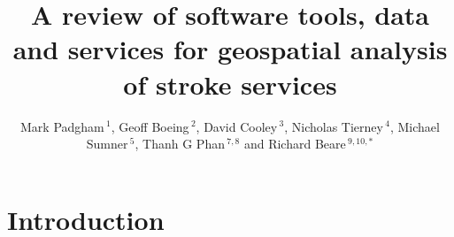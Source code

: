 \documentclass[utf8]{frontiersHLTH}
\def\firstAuthorLast{Padgham {et~al.}} %
\def\Authors{Mark Padgham\,$^{1}$, Geoff Boeing\,$^{2}$, David Cooley\,$^{3}$, Nicholas Tierney\,$^{4}$, Michael Sumner\,$^{5}$, Thanh G Phan\,$^{7,8}$ and Richard Beare\,$^{9,10,*}$}
\begin{document}
\onecolumn
{}

\title[Software tools for geospatial analysis]{A review of software tools, data and services for geospatial analysis of stroke services}

\author[\firstAuthorLast ]{\Authors} %
\address{} %
\correspondance{} %

\extraAuth{}%

\maketitle

\section{Introduction}\label{introduction}
\end{document}

